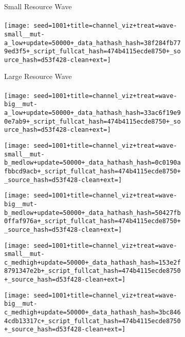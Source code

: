 \begin{figure}[!htbp]
\begin{center}
\begin{subfigure}[b]{0.45\columnwidth}
  \centering
  Small Resource Wave\\~\\
  \texttt{[image: seed=1001+title=channel\_viz+treat=wave-small\_\_mut-a\_low+update=50000+\_data\_hathash\_hash=38f284fb779ed3f5+\_script\_fullcat\_hash=474b4115ecde8750+\_source\_hash=d53f428-clean+ext=]}
\end{subfigure}
\begin{subfigure}[b]{0.45\columnwidth}
  \centering
  Large Resource Wave\\~\\
  \texttt{[image: seed=1001+title=channel\_viz+treat=wave-big\_\_mut-a\_low+update=50000+\_data\_hathash\_hash=33ac6f19e90e7ab9+\_script\_fullcat\_hash=474b4115ecde8750+\_source\_hash=d53f428-clean+ext=]}
\end{subfigure}

\begin{subfigure}[b]{0.45\columnwidth}
  \texttt{[image: seed=1001+title=channel\_viz+treat=wave-small\_\_mut-b\_medlow+update=50000+\_data\_hathash\_hash=0c0190afbbcd9acb+\_script\_fullcat\_hash=474b4115ecde8750+\_source\_hash=d53f428-clean+ext=]}
\end{subfigure}
\begin{subfigure}[b]{0.45\columnwidth}
  \texttt{[image: seed=1001+title=channel\_viz+treat=wave-big\_\_mut-b\_medlow+update=50000+\_data\_hathash\_hash=50427fb0ffaf976a+\_script\_fullcat\_hash=474b4115ecde8750+\_source\_hash=d53f428-clean+ext=]}
\end{subfigure}

\begin{subfigure}[b]{0.45\columnwidth}
  \texttt{[image: seed=1001+title=channel\_viz+treat=wave-small\_\_mut-c\_medhigh+update=50000+\_data\_hathash\_hash=153e2f8791347e2b+\_script\_fullcat\_hash=474b4115ecde8750+\_source\_hash=d53f428-clean+ext=]}
\end{subfigure}
\begin{subfigure}[b]{0.45\columnwidth}
  \texttt{[image: seed=1001+title=channel\_viz+treat=wave-big\_\_mut-c\_medhigh+update=50000+\_data\_hathash\_hash=3bc8464cdb13317c+\_script\_fullcat\_hash=474b4115ecde8750+\_source\_hash=d53f428-clean+ext=]}
\end{subfigure}


\end{center}
\end{figure}

